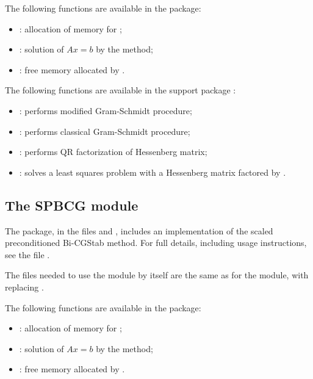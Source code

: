 The following functions are available in the {\spgmr} package:  
\begin{itemize}
\item {}: allocation of memory for ;
\item {}: solution of $Ax = b$ by the {\spgmr} method;
\item {}: free memory allocated by .
\end{itemize}
%
The following functions are available in the support package 
:
\begin{itemize}
\item {}: performs modified Gram-Schmidt procedure;
\item {}: performs classical Gram-Schmidt procedure; 
\item {}: performs QR factorization of Hessenberg matrix;
\item {}: solves a least squares problem with a Hessenberg
       matrix factored by .
\end{itemize}


\subsection{The SPBCG module}\label{ss:spbcg}

The {\spbcg} package, in the files  and , includes an
implementation of the scaled preconditioned Bi-CGStab method.  
For full details, including usage instructions, see the file .

The files needed to use the {\spbcg} module by itself are the same as for the
{\spgmr} module, with  replacing .

The following functions are available in the {\spbcg} package:  
\begin{itemize}
\item {}: allocation of memory for ;
\item {}: solution of $Ax = b$ by the {\spbcg} method;
\item {}: free memory allocated by .
\end{itemize}



